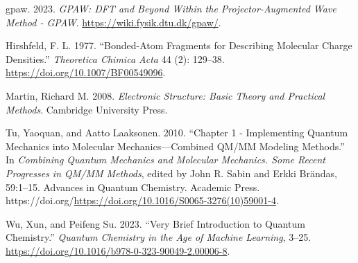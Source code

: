 \documentclass[
  letterpaper,
  DIV=11,
  numbers=noendperiod]{scrreprt}
\newlength{\cslhangindent}
\newlength{\cslentryspacingunit} %
\newenvironment{CSLReferences}[2] %
 {%
  \setlength{\parindent}{0pt}
  \ifodd #1
  \let\oldpar\par
  \def\par{\hangindent=\cslhangindent\oldpar}
  \fi
  \setlength{\parskip}{#2\cslentryspacingunit}
 }%
 {}
\begin{document}
\hypertarget{refs}{}
\begin{CSLReferences}{1}{0}
\leavevmode{}%
gpaw. 2023. \emph{GPAW: DFT and Beyond Within the Projector-Augmented
Wave Method - GPAW}. \url{https://wiki.fysik.dtu.dk/gpaw/}.

\leavevmode{}%
Hirshfeld, F. L. 1977. {``Bonded-Atom Fragments for Describing Molecular
Charge Densities.''} \emph{Theoretica Chimica Acta} 44 (2): 129--38.
\url{https://doi.org/10.1007/BF00549096}.

\leavevmode{}%
Martin, Richard M. 2008. \emph{Electronic Structure: Basic Theory and
Practical Methods}. Cambridge University Press.

\leavevmode{}%
Tu, Yaoquan, and Aatto Laaksonen. 2010. {``Chapter 1 - Implementing
Quantum Mechanics into Molecular Mechanics---Combined QM/MM Modeling
Methods.''} In \emph{Combining Quantum Mechanics and Molecular
Mechanics. Some Recent Progresses in QM/MM Methods}, edited by John R.
Sabin and Erkki Brändas, 59:1--15. Advances in Quantum Chemistry.
Academic Press.
https://doi.org/\url{https://doi.org/10.1016/S0065-3276(10)59001-4}.

\leavevmode{}%
Wu, Xun, and Peifeng Su. 2023. {``Very Brief Introduction to Quantum
Chemistry.''} \emph{Quantum Chemistry in the Age of Machine Learning},
3--25. \url{https://doi.org/10.1016/b978-0-323-90049-2.00006-8}.

\end{CSLReferences}
\end{document}
